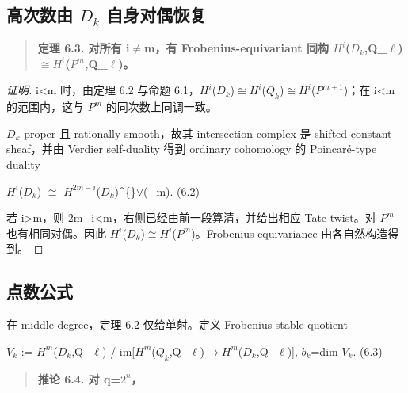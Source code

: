 \documentclass[11pt]{ctexart}
\begin{document}
\subsection{高次数由 \ensuremath{D_{k}} 自身对偶恢复}

\begin{quote}\textbf{定理 6.3. 对所有 i\ensuremath{\ne}m，有 Frobenius-equivariant 同构 \ensuremath{H^{i}}(\ensuremath{D_{k}},Q\_\ensuremath{\ell})\ensuremath{\cong}\ensuremath{H^{i}}(\ensuremath{P^{m}},Q\_\ensuremath{\ell})。}\end{quote}

\begin{proof}[证明] 

i<m 时，由定理 6.2 与命题 6.1，\ensuremath{H^{i}}(\ensuremath{D_{k}})\ensuremath{\cong}\ensuremath{H^{i}}(\ensuremath{Q_{k}})\ensuremath{\cong}\ensuremath{H^{i}}(\ensuremath{P^{m+1}})；在 i<m 的范围内，这与 \ensuremath{P^{m}} 的同次数上同调一致。

\ensuremath{D_{k}} proper 且 rationally smooth，故其 intersection complex 是 shifted constant sheaf，并由 Verdier self-duality 得到 ordinary cohomology 的 Poincaré-type duality

\ensuremath{H^{i}}(\ensuremath{D_{k}}) \ensuremath{\cong} \ensuremath{H^{2m−i}}(\ensuremath{D_{k}})\textasciicircum\{\}\ensuremath{\lor}(−m).    (6.2)

若 i>m，则 2m−i<m，右侧已经由前一段算清，并给出相应 Tate twist。对 \ensuremath{P^{m}} 也有相同对偶。因此 \ensuremath{H^{i}}(\ensuremath{D_{k}})\ensuremath{\cong}\ensuremath{H^{i}}(\ensuremath{P^{m}})。Frobenius-equivariance 由各自然构造得到。

\end{proof}

\subsection{点数公式}

在 middle degree，定理 6.2 仅给单射。定义 Frobenius-stable quotient

\ensuremath{V_{k}} := \ensuremath{H^{m}}(\ensuremath{D_{k}},Q\_\ensuremath{\ell}) / im[\ensuremath{H^{m}}(\ensuremath{Q_{k}},Q\_\ensuremath{\ell})\ensuremath{\to}\ensuremath{H^{m}}(\ensuremath{D_{k}},Q\_\ensuremath{\ell})],    \ensuremath{b_{k}}=dim \ensuremath{V_{k}}.    (6.3)

\begin{quote}\textbf{推论 6.4. 对 q=\ensuremath{2^{n}}，}\end{quote}
\end{document}
